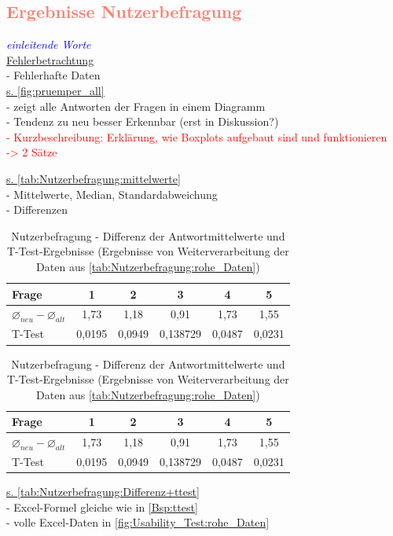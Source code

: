 \newpage
\subsection{\textcolor{Salmon}{Ergebnisse Nutzerbefragung}}
\textcolor{blue}{\textit{einleitende Worte}} \\

\noindent
\underline{Fehlerbetrachtung}\\
- Fehlerhafte Daten\\

\noindent
\underline{s. \autoref{fig:pruemper_all}}\\
- zeigt alle Antworten der Fragen in einem Diagramm\\
- Tendenz zu neu besser Erkennbar (erst in Diskussion?)\\
\textcolor{red}{- Kurzbeschreibung: Erklärung, wie Boxplots aufgebaut sind und funktionieren\\
-> 2 Sätze} %

\noindent
\underline{s. \autoref{tab:Nutzerbefragung:mittelwerte}}\\
- Mittelwerte, Median, Standardabweichung\\
- Differenzen

\begin{table}[H]
\begin{center}
\begin{tabular}{|l|c|c|c|c|c|}
\hline
Frage                                   & 1      & 2      & 3        & 4      & 5      \\ \hline
$\varnothing_{neu} - \varnothing_{alt}$ & 1,73   & 1,18   & 0,91     & 1,73   & 1,55   \\ \hline
T-Test                                  & 0,0195 & 0,0949 & 0,138729 & 0,0487 & 0,0231 \\ \hline
\end{tabular}
\begin{tabular}{|l|c|c|c|c|c|}
\hline
Frage                                   & 1      & 2      & 3        & 4      & 5      \\ \hline
$\varnothing_{neu} - \varnothing_{alt}$ & 1,73   & 1,18   & 0,91     & 1,73   & 1,55   \\ \hline
T-Test                                  & 0,0195 & 0,0949 & 0,138729 & 0,0487 & 0,0231 \\ \hline
\end{tabular}
\caption{Nutzerbefragung - Differenz der Antwortmittelwerte und T-Test-Ergebnisse (Ergebnisse von Weiterverarbeitung der Daten aus \autoref{tab:Nutzerbefragung:rohe_Daten})}
\label{tab:Nutzerbefragung:Differenz+ttest}
\end{center}
\end{table}

\noindent
\underline{s. \autoref{tab:Nutzerbefragung:Differenz+ttest}}\\
- Excel-Formel gleiche wie in \autoref{Bsp:ttest}\\
- volle Excel-Daten in \autoref{fig:Usability_Test:rohe_Daten}
